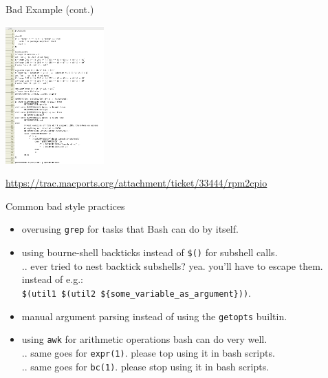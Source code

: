 \begin{frame}{Bad Example (cont.)}

\includegraphics[height=200px]{rpm2cpio}

\tiny
\url{https://trac.macports.org/attachment/ticket/33444/rpm2cpio}

\end{frame}

\begin{frame}{Common bad style practices}

\begin{itemize}
\itemsep1pt\parskip0pt
\item
  overusing \texttt{grep} for tasks that Bash can do by itself.
\item
  using bourne-shell backticks instead of \texttt{\$()} for subshell
  calls.\\ .. ever tried to nest backtick subshells? yea. you'll have to
  escape them. instead of e.g.:\\
  \texttt{\$(util1 \$(util2 \$\{some\_variable\_as\_argument\}))}.
\item
  manual argument parsing instead of using the \texttt{getopts} builtin.
\item
  using \texttt{awk} for arithmetic operations bash can do very well.\\
  .. same goes for \texttt{expr(1)}. please top using it in bash
  scripts.\\ .. same goes for \texttt{bc(1)}. please stop using it in
  bash scripts.
\end{itemize}

\end{frame}

